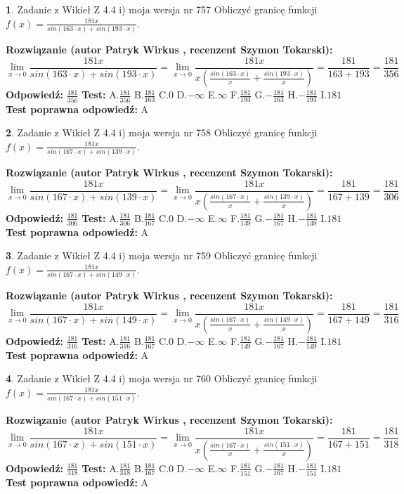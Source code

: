 \documentclass[12pt, a4paper]{article}
\theoremstyle{definition} %
\newtheorem{zad}{}
\newcommand{\zadStart}[1]{\begin{zad}#1\newline}
\newcommand{\zadStop}{\end{zad}}
\newcommand{\rozwStart}[2]{\noindent \textbf{Rozwiązanie (autor #1 , recenzent #2): }\newline}
\newcommand{\rozwStop}{\newline}
\newcommand{\odpStart}{\noindent \textbf{Odpowiedź:}\newline}
\newcommand{\odpStop}{\newline}
\newcommand{\testStart}{\noindent \textbf{Test:}\newline}
\newcommand{\testStop}{\newline}
\newcommand{\kluczStart}{\noindent \textbf{Test poprawna odpowiedź:}\newline}
\newcommand{\kluczStop}{\newline}
\begin{document}
\zadStart{Zadanie z Wikieł Z 4.4 i) moja wersja nr 757}
Obliczyć granicę funkcji $f(x)=\frac{181x}{sin(163\cdot x) +sin(193\cdot x)}$.
\zadStop
\rozwStart{Patryk Wirkus}{Szymon Tokarski}
$$\lim\limits_{x\to 0}\frac{181x}{sin(163\cdot x) +sin(193\cdot x)}=\lim\limits_{x\to 0}\frac{181x}{x(\frac{sin(163\cdot x)}{x}+\frac{sin(193\cdot x)}{x})}=\frac{181}{163+193} = \frac{181}{356}$$
\rozwStop
\odpStart
$\frac{181}{356}$
\odpStop
\testStart
A.$\frac{181}{356}$
B.$\frac{181}{163}$
C.$0$
D.$-\infty$
E.$\infty$
F.$\frac{181}{193}$
G.$-\frac{181}{163}$
H.$-\frac{181}{193}$
I.$181$
\testStop
\kluczStart
A
\kluczStop



\zadStart{Zadanie z Wikieł Z 4.4 i) moja wersja nr 758}
Obliczyć granicę funkcji $f(x)=\frac{181x}{sin(167\cdot x) +sin(139\cdot x)}$.
\zadStop
\rozwStart{Patryk Wirkus}{Szymon Tokarski}
$$\lim\limits_{x\to 0}\frac{181x}{sin(167\cdot x) +sin(139\cdot x)}=\lim\limits_{x\to 0}\frac{181x}{x(\frac{sin(167\cdot x)}{x}+\frac{sin(139\cdot x)}{x})}=\frac{181}{167+139} = \frac{181}{306}$$
\rozwStop
\odpStart
$\frac{181}{306}$
\odpStop
\testStart
A.$\frac{181}{306}$
B.$\frac{181}{167}$
C.$0$
D.$-\infty$
E.$\infty$
F.$\frac{181}{139}$
G.$-\frac{181}{167}$
H.$-\frac{181}{139}$
I.$181$
\testStop
\kluczStart
A
\kluczStop



\zadStart{Zadanie z Wikieł Z 4.4 i) moja wersja nr 759}
Obliczyć granicę funkcji $f(x)=\frac{181x}{sin(167\cdot x) +sin(149\cdot x)}$.
\zadStop
\rozwStart{Patryk Wirkus}{Szymon Tokarski}
$$\lim\limits_{x\to 0}\frac{181x}{sin(167\cdot x) +sin(149\cdot x)}=\lim\limits_{x\to 0}\frac{181x}{x(\frac{sin(167\cdot x)}{x}+\frac{sin(149\cdot x)}{x})}=\frac{181}{167+149} = \frac{181}{316}$$
\rozwStop
\odpStart
$\frac{181}{316}$
\odpStop
\testStart
A.$\frac{181}{316}$
B.$\frac{181}{167}$
C.$0$
D.$-\infty$
E.$\infty$
F.$\frac{181}{149}$
G.$-\frac{181}{167}$
H.$-\frac{181}{149}$
I.$181$
\testStop
\kluczStart
A
\kluczStop



\zadStart{Zadanie z Wikieł Z 4.4 i) moja wersja nr 760}
Obliczyć granicę funkcji $f(x)=\frac{181x}{sin(167\cdot x) +sin(151\cdot x)}$.
\zadStop
\rozwStart{Patryk Wirkus}{Szymon Tokarski}
$$\lim\limits_{x\to 0}\frac{181x}{sin(167\cdot x) +sin(151\cdot x)}=\lim\limits_{x\to 0}\frac{181x}{x(\frac{sin(167\cdot x)}{x}+\frac{sin(151\cdot x)}{x})}=\frac{181}{167+151} = \frac{181}{318}$$
\rozwStop
\odpStart
$\frac{181}{318}$
\odpStop
\testStart
A.$\frac{181}{318}$
B.$\frac{181}{167}$
C.$0$
D.$-\infty$
E.$\infty$
F.$\frac{181}{151}$
G.$-\frac{181}{167}$
H.$-\frac{181}{151}$
I.$181$
\testStop
\kluczStart
A
\kluczStop
\end{document}
